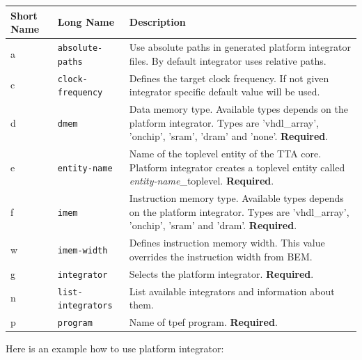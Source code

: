 \documentclass[a4paper,twoside]{tceusermanual}
\begin{document}
\begin{center}
\begin{longtable}[htb]{@{}p{}@{}p{}%
                     @{}p{}}

\textbf{Short Name} &\textbf{Long Name} &\textbf{Description} \\
\hline

a & \verb|absolute-paths| &
Use absolute paths in generated platform integrator files. By default
integrator uses relative paths.\\

c & \verb|clock-frequency| &
Defines the target clock frequency. If not given integrator specific default
value will be used. \\

d & \verb|dmem| &
Data memory type. Available types depends on the platform integrator. Types are
'vhdl\_array', 'onchip', 'sram', 'dram' and 'none'. \textbf{Required}. \\

e & \verb|entity-name| &
Name of the toplevel entity of the TTA core. Platform integrator creates a
toplevel entity called \textit{entity-name}\_toplevel.
\textbf{Required}. \\

f & \verb|imem| &
Instruction memory type. Available types depends on the platform integrator.
Types are 'vhdl\_array', 'onchip', 'sram' and 'dram'. \textbf{Required}. \\

w & \verb|imem-width| &
Defines instruction memory width. This value overrides the instruction width
from BEM. \\

g & \verb|integrator| &
Selects the platform integrator. \textbf{Required}. \\

n & \verb|list-integrators| &
List available integrators and information about them. \\

p & \verb|program| &
Name of tpef program. \textbf{Required}.

\end{longtable}
\end{center}

Here is an example how to use platform integrator:

\end{document}

